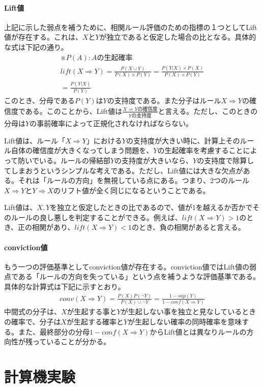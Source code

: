 \documentclass[dvipdfmx]{jsarticle}
\begin{document}
\paragraph{Lift値}
上記に示した弱点を補うために、相関ルール評価のための指標の１つとしてLift値が存在する。これは、$X$と$Y$が独立であると仮定した場合の比となる。具体的な式は下記の通り。
\begin{gather*}
  ※P(A):Aの生起確率\\
  lift(X \Rightarrow Y) = \frac{P(X\cup Y)}{P(X)\times P(Y)} = \frac{P(Y | X)\times P(X)}{P(X)\times P(Y)} \\
  = \frac{P(Y | X)}{P(Y)}
\end{gather*}
このとき、分母である$P(Y)$は$Y$の支持度である。また分子はルール$X \Rightarrow Y$の確信度である。このことから、Lift値は$\frac{X \Rightarrow Yの確信度}{Yの支持度}$と言える。ただし、このときの分母は$Y$の事前確率によって正規化されなければならない。\par
Lift値は、ルール「$X \Rightarrow Y$」における$Y$の支持度が大きい時に、計算上そのルール自体の確信度が大きくなってしまう問題を、$Y$の生起確率を考慮することによって防いでいる。ルールの帰結部$Y$の支持度が大きいなら、$Y$の支持度で除算してしまおうというシンプルな考えである。ただし、Lift値には大きな欠点がある。それは「ルールの方向」を無視している点にある。つまり、2つのルール$X \Rightarrow Y$と$Y\Rightarrow X$のリフト値が全く同じになるということである。\par
Lift値は、$X, Y$を独立と仮定したときの比であるので、値が1を越えるか否かでそのルールの良し悪しを判定することができる。例えば、$lift(X\Rightarrow Y) > 1$のとき、正の相関があり、$lift(X\Rightarrow Y) < 1$のとき、負の相関があると言える。
\paragraph{conviction値}
もう一つの評価基準としてconviction値が存在する。conviction値ではLift値の弱点である「ルールの方向を失っている」という点を補うような評価基準である。具体的な計算式は下記に示すとおり。
\begin{gather*}
  conv(X \Rightarrow Y) = \frac{P(X)P(\neg Y)}{P(X)\cup \neg Y} = \frac{1-sup(Y)}{1-conf(X \Rightarrow Y)}
\end{gather*}
中間式の分子は、$X$が生起する事と$Y$が生起しない事を独立と見なしているときの確率で、分子は$X$が生起する確率と$Y$が生起しない確率の同時確率を意味する。また、最終部分の分母$1-conf(X \Rightarrow Y)$からLift値とは異なりルールの方向性が残っていることが分かる。
\section{計算機実験}
\end{document}
